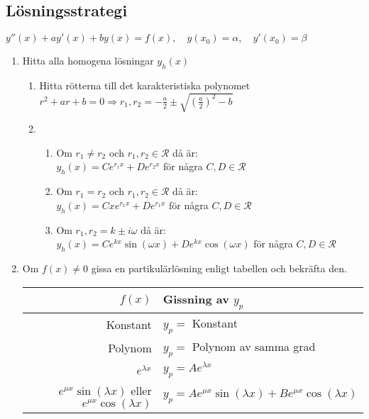 \documentclass{article}
\begin{document}
\subsection{Lösningsstrategi}
$y''(x)+ay'(x)+by(x)=f(x),\quad y(x_{0})=\alpha,\quad y'(x_{0})=\beta$
\begin{enumerate}
   \item Hitta alla homogena lösningar $y_{h}(x)$
   \begin{enumerate}
      \item Hitta rötterna till det karakteristiska polynomet\\
      $r^2+ar+b=0\Rightarrow r_{1},r_{2}=-\frac{a}{2}\pm \sqrt{(\frac{a}{2})^2-b}$
      \item
      \begin{enumerate}
         \item Om $r_{1}\neq r_{2}$ och $r_{1},r_{2}\in\mathcal{R}$ då är:\\
         $y_{h}(x)=Ce^{r_{1}x}+De^{r_{2}x}$ för några $C,D\in\mathcal{R}$
         \item Om $r_{1}=r_{2}$ och $r_{1},r_{2}\in\mathcal{R}$ då är:\\
         $y_{h}(x)=Cxe^{r_{1}x}+De^{r_{1}x}$ för några $C,D\in\mathcal{R}$
         \item Om $r_{1},r_{2}=k\pm i\omega$ då är:\\
         $y_{h}(x)=Ce^{kx}\sin(\omega x)+De^{kx}\cos(\omega x)$ för några $C,D\in\mathcal{R}$
      \end{enumerate}
   \end{enumerate}
   \item Om $f(x)\neq 0$ gissa en partikulärlösning enligt tabellen och bekräfta den.
   \begin{table}[!h]
   \centering
   \begin{tabular}{|r|l|}
   \hline
   $f(x)$                            & Gissning av $y_{p}$                                         \\ \hline
   Konstant                          & $y_{p}=$ Konstant                                            \\ \hline
   Polynom                           & $y_{p}=$ Polynom av samma grad                               \\ \hline
   $e^{\lambda x}$                   & $y_{p}=Ae^{\lambda x}$                                      \\ \hline
   $e^{\mu x}\sin(\lambda x)$ eller $e^{\mu x}\cos(\lambda x)$        & $y_{p}=Ae^{\mu x}\sin(\lambda x)+Be^{\mu x}\cos(\lambda x)$ \\ \hline
   \end{tabular}
   \end{table}


\end{enumerate}
\end{document}
